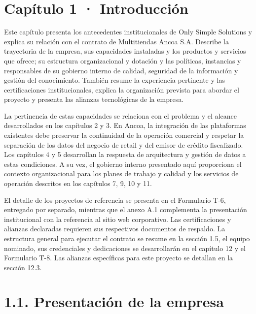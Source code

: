 \documentclass[11pt]{article}
\begin{document}
\renewcommand{\tablename}{Tabla}

\tableofcontents
\clearpage
\renewcommand{\listfigurename}{Lista de figuras}
\listoffigures
\clearpage
\renewcommand{\listtablename}{Lista de tablas}
\listoftables
\clearpage

\section{Capítulo 1 · Introducción}\label{capuxedtulo-1-introducciuxf3n}

Este capítulo presenta los antecedentes institucionales de Only Simple Solutions y explica su relación con el contrato de Multitiendas Ancoa S.A. Describe la trayectoria de la empresa, sus capacidades instaladas y los productos y servicios que ofrece; su estructura organizacional y dotación y las políticas, instancias y responsables de su gobierno interno de calidad, seguridad de la información y gestión del conocimiento. También resume la experiencia pertinente y las certificaciones institucionales, explica la organización prevista para abordar el proyecto y presenta las alianzas tecnológicas de la empresa.

La pertinencia de estas capacidades se relaciona con el problema y el alcance desarrollados en los capítulos 2 y 3. En Ancoa, la integración de las plataformas existentes debe preservar la continuidad de la operación comercial y respetar la separación de los datos del negocio de retail y del emisor de crédito fiscalizado. Los capítulos 4 y 5 desarrollan la respuesta de arquitectura y gestión de datos a estas condiciones. A su vez, el gobierno interno presentado aquí proporciona el contexto organizacional para los planes de trabajo y calidad y los servicios de operación descritos en los capítulos 7, 9, 10 y 11.

El detalle de los proyectos de referencia se presenta en el Formulario T-6, entregado por separado, mientras que el anexo A.1 complementa la presentación institucional con la referencia al sitio web corporativo. Las certificaciones y alianzas declaradas requieren sus respectivos documentos de respaldo. La estructura general para ejecutar el contrato se resume en la sección 1.5, el equipo nominado, sus credenciales y dedicaciones se desarrollarán en el capítulo 12 y el Formulario T-8. Las alianzas específicas para este proyecto se detallan en la sección 12.3.

\section{1.1. Presentación de la empresa}\label{presentaciuxf3n-de-la-empresa}
\end{document}
